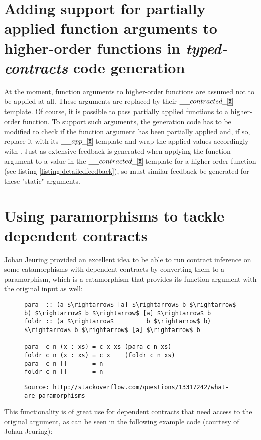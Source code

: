 \documentclass[10pt]{report}
\newcommand{\ctrttemplate}{\underline{\hspace{1.5em}}contracted\_\code{X}}
\newcommand{\apptemplate}{\underline{\hspace{1.5em}}app\_\code{X}}
\newcommand{\code}[1]{%
  {%
   \setlength{\fboxsep}{-2\fboxrule}%
   \fcolorbox{black}{light-gray}{\hspace{1.5pt}\strut\texttt{#1}\hspace{1.5pt}}%
  }%
}
\begin{document}
{\section{Adding support for partially applied function arguments to higher-order functions in \textit{typed-contracts} code generation}

At the moment, function arguments to higher-order functions are assumed not to be applied at all.
These arguments are replaced by their $\ctrttemplate$ template.
Of course, it is possible to pass partially applied functions to a higher-order function.
To support such arguments, the generation code has to be modified to check if the function argument has been partially applied and, if so, replace it with its $\apptemplate$ template and wrap the applied values accordingly with \code{appParam}.
Just as extensive feedback is generated when applying the function argument to a value in the $\ctrttemplate$ template for a higher-order function (see listing \ref{listing:detailedfeedback}), so must similar feedback be generated for these "static" arguments.

\section{Using paramorphisms to tackle dependent contracts}

Johan Jeuring provided an excellent idea to be able to run contract inference on some catamorphisms with dependent contracts by converting them to a paramorphism, which is a catamorphism that provides its function argument with the original input as well:

\begin{figure}[htps]
\begin{lstlisting}[mathescape]
para  :: (a $\rightarrow$ [a] $\rightarrow$ b $\rightarrow$ b) $\rightarrow$ b $\rightarrow$ [a] $\rightarrow$ b
foldr :: (a $\rightarrow$         b $\rightarrow$ b) $\rightarrow$ b $\rightarrow$ [a] $\rightarrow$ b

para  c n (x : xs) = c x xs (para c n xs)
foldr c n (x : xs) = c x    (foldr c n xs)
para  c n []       = n
foldr c n []       = n
\end{lstlisting}
\texttt{\scriptsize{Source: http://stackoverflow.com/questions/13317242/what-are-paramorphisms}}
\end{figure}

This functionality is of great use for dependent contracts that need access to the original argument, as can be seen in the following example code (courtesy of Johan Jeuring):

}
\end{document}
